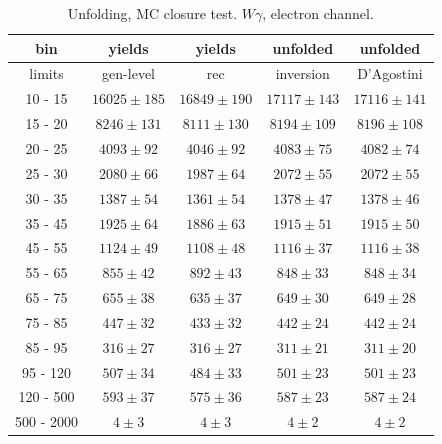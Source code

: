 \begin{table}[h]
  \scriptsize
  \begin{center}
  \caption{Unfolding, MC closure test. $W\gamma$, electron channel.}
  \begin{tabular}{|c|c|c|c|c|}
  bin &  yields &   yields &  unfolded &  unfolded \\ \hline
   limits &  gen-level & rec &  inversion &  D'Agostini \\ \hline
 10 -  15 &     $16025\pm 185$ &     $16849\pm 190$ &     $17117\pm143$ &     $17116\pm141$ \\ \hline
 15 -  20 &     $8246\pm 131$ &     $8111\pm 130$ &     $8194\pm109$ &     $8196\pm108$ \\ \hline
 20 -  25 &     $4093\pm  92$ &     $4046\pm  92$ &     $4083\pm75$ &     $4082\pm74$ \\ \hline
 25 -  30 &     $2080\pm  66$ &     $1987\pm  64$ &     $2072\pm55$ &     $2072\pm55$ \\ \hline
 30 -  35 &     $1387\pm  54$ &     $1361\pm  54$ &     $1378\pm47$ &     $1378\pm46$ \\ \hline
 35 -  45 &     $1925\pm  64$ &     $1886\pm  63$ &     $1915\pm51$ &     $1915\pm50$ \\ \hline
 45 -  55 &     $1124\pm  49$ &     $1108\pm  48$ &     $1116\pm37$ &     $1116\pm38$ \\ \hline
 55 -  65 &     $855\pm  42$ &     $892\pm  43$ &     $848\pm33$ &     $848\pm34$ \\ \hline
 65 -  75 &     $655\pm  38$ &     $635\pm  37$ &     $649\pm30$ &     $649\pm28$ \\ \hline
 75 -  85 &     $447\pm  32$ &     $433\pm  32$ &     $442\pm24$ &     $442\pm24$ \\ \hline
 85 -  95 &     $316\pm  27$ &     $316\pm  27$ &     $311\pm21$ &     $311\pm20$ \\ \hline
 95 - 120 &     $507\pm  34$ &     $484\pm  33$ &     $501\pm23$ &     $501\pm23$ \\ \hline
120 - 500 &     $593\pm  37$ &     $575\pm  36$ &     $587\pm23$ &     $587\pm24$ \\ \hline
500 - 2000 &     $4\pm   3$ &     $4\pm   3$ &     $4\pm2$ &     $4\pm2$ \\ \hline
  \end{tabular}
  \label{tab:unf_mc_closure_ELECTRON_WGamma}
  \end{center}
\end{table}
